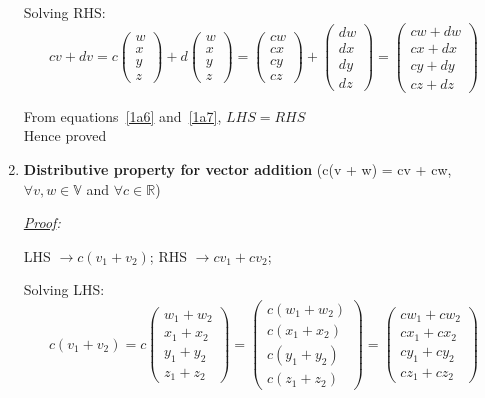 \documentclass[12pt, letterpaper]{article}
\begin{document}
\begin{enumerate}
  Solving RHS:
  \begin{equation}
  \label{1a7}
    cv + dv
    = c\begin{pmatrix}w\\x\\y\\z\end{pmatrix} + d\begin{pmatrix}w\\x\\y\\z\end{pmatrix}
    = \begin{pmatrix}cw\\cx\\cy\\cz\end{pmatrix} + \begin{pmatrix}dw\\dx\\dy\\dz\end{pmatrix}
    = \begin{pmatrix}cw + dw\\cx + dx\\cy + dy\\cz + dz\end{pmatrix}
  \end{equation}

  From equations~\ref{1a6} and~\ref{1a7}, $\boxed{LHS = RHS}$
  \\Hence proved

\item \textbf{Distributive property for vector addition}
  (c(v + w) = cv + cw, $\forall v,w \in \mathbb{V}$ and $\forall c \in \mathbb{R}$)

\textit{\underline{Proof}:}

  LHS $\to c(v_1 + v_2)$; RHS $\to cv_1 + cv_2$;

  Solving LHS:
  \begin{equation}
  \label{1a8}
    c(v_1 + v_2)
    = c\begin{pmatrix}w_1 + w_2\\x_1 + x_2\\y_1 + y_2\\z_1 + z_2\end{pmatrix}
    = \begin{pmatrix}c(w_1 + w_2)\\c(x_1 + x_2)\\c(y_1 + y_2)\\c(z_1 + z_2)\end{pmatrix}
    = \begin{pmatrix}cw_1 + cw_2\\cx_1 + cx_2\\cy_1 + cy_2\\cz_1 + cz_2\end{pmatrix}
  \end{equation}


\end{enumerate}
\end{document}
